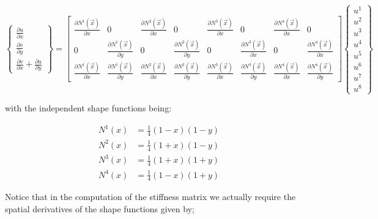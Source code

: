 \[\left\{ {\begin{array}{*{20}{c}}
{\frac{{\partial u}}{{\partial x}}}\\
{\frac{{\partial v}}{{\partial y}}}\\
{\frac{{\partial v}}{{\partial x}} + \frac{{\partial u}}{{\partial y}}}
\end{array}} \right\} = \left[ {\begin{array}{*{20}{c}}
{\frac{{\partial {N^1}(\vec x)}}{{\partial x}}}&0&{\frac{{\partial {N^2}(\vec x)}}{{\partial x}}}&0&{\frac{{\partial {N^3}(\vec x)}}{{\partial x}}}&0&{\frac{{\partial {N^4}(\vec x)}}{{\partial x}}}&0\\
0&{\frac{{\partial {N^1}(\vec x)}}{{\partial y}}}&0&{\frac{{\partial {N^2}(\vec x)}}{{\partial y}}}&0&{\frac{{\partial {N^3}(\vec x)}}{{\partial x}}}&0&{\frac{{\partial {N^4}(\vec x)}}{{\partial x}}}\\
{\frac{{\partial {N^1}(\vec x)}}{{\partial x}}}&{\frac{{\partial {N^1}(\vec x)}}{{\partial y}}}&{\frac{{\partial {N^2}(\vec x)}}{{\partial x}}}&{\frac{{\partial {N^2}(\vec x)}}{{\partial y}}}&{\frac{{\partial {N^3}(\vec x)}}{{\partial x}}}&{\frac{{\partial {N^3}(\vec x)}}{{\partial y}}}&{\frac{{\partial {N^4}(\vec x)}}{{\partial x}}}&{\frac{{\partial {N^4}(\vec x)}}{{\partial y}}}
\end{array}} \right]\left\{ {\begin{array}{*{20}{c}}
{{u^1}}\\
{{u^2}}\\
{{u^3}}\\
{{u^4}}\\
{{u^5}}\\
{{u^6}}\\
{{u^7}}\\
{{u^8}}
\end{array}} \right\}\]

with the independent shape functions being:


\begin{align*}
{N^1}(x) & = \frac{1}{4}(1 - x)(1 - y) \\
{N^2}(x) & = \frac{1}{4}(1 + x)(1 - y) \\
{N^3}(x) & = \frac{1}{4}(1 + x)(1 + y) \\
{N^4}(x) & = \frac{1}{4}(1 - x)(1 + y)
\end{align*}




Notice that in the computation of the stiffness matrix we actually require the spatial derivatives of the shape functions given by;


